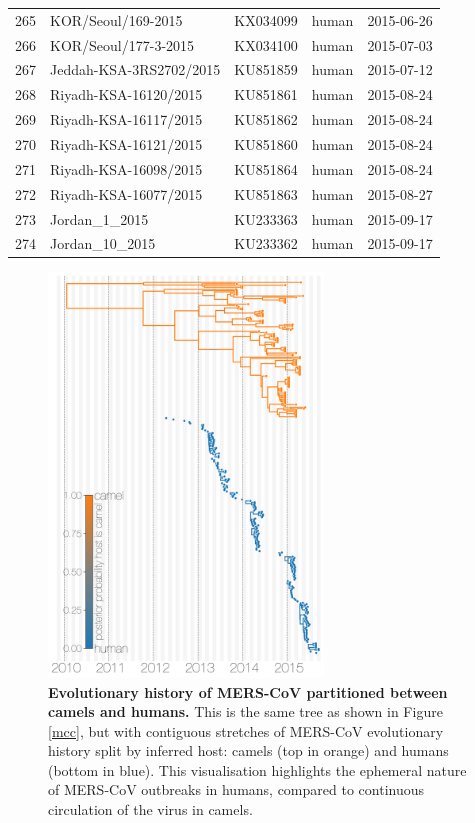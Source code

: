 \documentclass[11pt,oneside,letterpaper]{article}
\begin{document}
\begin{longtable}{ | r | l | p{2cm} | l | l | }
  265 & KOR/Seoul/169-2015 & KX034099 & human & 2015-06-26 \\
  266 & KOR/Seoul/177-3-2015 & KX034100 & human & 2015-07-03 \\
  267 & Jeddah-KSA-3RS2702/2015 & KU851859 & human & 2015-07-12 \\
  268 & Riyadh-KSA-16120/2015 & KU851861 & human & 2015-08-24 \\
  269 & Riyadh-KSA-16117/2015 & KU851862 & human & 2015-08-24 \\
  270 & Riyadh-KSA-16121/2015 & KU851860 & human & 2015-08-24 \\
  271 & Riyadh-KSA-16098/2015 & KU851864 & human & 2015-08-24 \\
  272 & Riyadh-KSA-16077/2015 & KU851863 & human & 2015-08-27 \\
  273 & Jordan\_1\_2015 & KU233363 & human & 2015-09-17 \\
  274 & Jordan\_10\_2015 & KU233362 & human & 2015-09-17 \\
\end{longtable}

\begin{figure}[h]
\centering
	\includegraphics[width=0.65\textwidth]{figures/mers_exploded.png}
	\caption{\textbf{Evolutionary history of MERS-CoV partitioned between camels and humans.}
This is the same tree as shown in Figure \ref{mcc}, but with contiguous stretches of MERS-CoV evolutionary history split by inferred host: camels (top in orange) and humans (bottom in blue).
This visualisation highlights the ephemeral nature of MERS-CoV outbreaks in humans, compared to continuous circulation of the virus in camels.
	}
	\label{exploded}
\end{figure}
\end{document}
